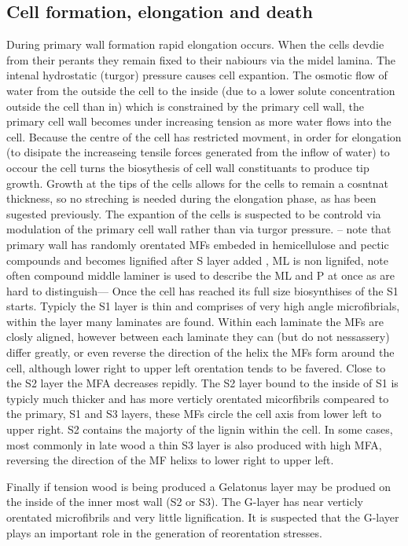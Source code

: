 \documentclass{article}
\begin{document}
\subsection{Cell formation, elongation and death}
During primary wall formation rapid elongation occurs. When the cells devdie
from their perants they remain fixed to their nabiours via the midel lamina. The
intenal hydrostatic (turgor) pressure causes cell expantion. The osmotic flow of
water from the outside the cell to the inside (due to a lower solute concentration
outside the cell than in) which is constrained by the primary cell wall, the
primary cell wall becomes under increasing tension as more water flows into
the cell. Because the centre of the cell has restricted movment, in order for
elongation (to disipate the increaseing tensile forces generated from the
inflow of water) to occour the cell turns the biosythesis of cell wall
constituants to produce tip growth. Growth at the tips of the cells allows for
the cells to remain a cosntnat thickness, so no streching is needed during the
elongation phase, as has been sugested previously. The expantion of the cells is
suspected to be controld via modulation of the primary cell wall rather than via
turgor pressure. -- note that primary wall has randomly orentated MFs embeded
in hemicellulose and pectic compounds and becomes lignified after S layer added
, ML is non lignifed, note often compound middle laminer is used to describe
the ML and P at once as are hard to distinguish--- Once the cell has reached its
full size biosynthises of the S1 starts.
Typicly the S1 layer is thin and comprises of very high angle microfibrials,
within the layer many laminates are found. Within each laminate the MFs are
closly aligned, however between each laminate they can (but do not nessassery)
differ greatly, or even reverse the direction of the helix the MFs form around
the cell, although lower right to upper left orentation tends to be favered.
Close to the S2 layer the MFA decreases repidly.
The S2 layer bound to the inside of S1 is typicly much thicker and has more verticly orentated
micorfibrils compeared to the primary, S1 and S3 layers, these MFs circle the
cell axis from lower left to upper right. S2 contains the majorty of the lignin
within the cell. In some cases, most commonly in late wood a thin S3 layer is
also produced with high MFA, reversing the direction of the MF helixs to lower
right to upper left.

Finally if tension wood is being produced a Gelatonus layer
may be produed on the inside of the inner most wall (S2 or S3). The G-layer has
near verticly orentated microfibrils and very little lignification. It is suspected that the
G-layer plays an important role in the generation of reorentation stresses.
\end{document}
